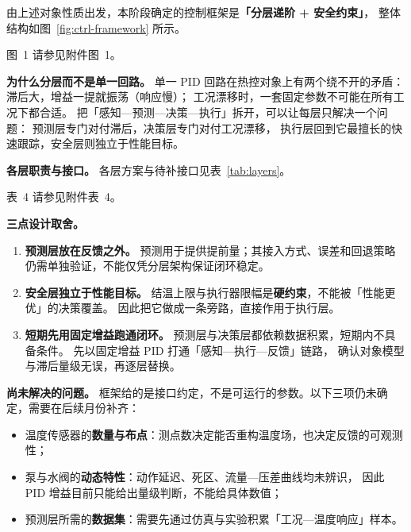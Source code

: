 \documentclass[stage2,fontset=fandol]{ydzjreport}
\makeatletter
\newcommand{\submissionnumber}[1]{\def\@currentlabel{#1}}
\makeatother
\begin{document}
	由上述对象性质出发，本阶段确定的控制框架是\textbf{「分层递阶 + 安全约束」}，
	整体结构如图~\ref{fig:ctrl-framework} 所示。


\par\noindent \begingroup\submissionnumber{1}\label{fig:ctrl-framework}\endgroup 图~1 请参见附件图~1。\par


	\textbf{为什么分层而不是单一回路。}
	单一 PID 回路在热控对象上有两个绕不开的矛盾：
	滞后大，增益一提就振荡（响应慢）；
	工况漂移时，一套固定参数不可能在所有工况下都合适。
	把「感知—预测—决策—执行」拆开，可以让每层只解决一个问题：
	预测层专门对付滞后，决策层专门对付工况漂移，
	执行层回到它最擅长的快速跟踪，安全层则独立于性能目标。

	\textbf{各层职责与接口。}
各层方案与待补接口见表~\ref{tab:layers}。


\par\noindent \begingroup\submissionnumber{4}\label{tab:layers}\endgroup 表~4 请参见附件表~4。\par


	\textbf{三点设计取舍。}

	\begin{enumerate}
		\item \textbf{预测层放在反馈之外。}
		预测用于提供提前量；其接入方式、误差和回退策略仍需单独验证，不能仅凭分层架构保证闭环稳定。
		\item \textbf{安全层独立于性能目标。}
		结温上限与执行器限幅是\textbf{硬约束}，不能被「性能更优」的决策覆盖。
		因此把它做成一条旁路，直接作用于执行层。
		\item \textbf{短期先用固定增益跑通闭环。}
		预测层与决策层都依赖数据积累，短期内不具备条件。
		先以固定增益 PID 打通「感知—执行—反馈」链路，
		确认对象模型与滞后量级无误，再逐层替换。
	\end{enumerate}

	\textbf{尚未解决的问题。}
	框架给的是接口约定，不是可运行的参数。以下三项仍未确定，需要在后续月份补齐：

	\begin{itemize}
		\item 温度传感器的\textbf{数量与布点}：测点数决定能否重构温度场，也决定反馈的可观测性；
		\item 泵与水阀的\textbf{动态特性}：动作延迟、死区、流量—压差曲线均未辨识，
		因此 PID 增益目前只能给出量级判断，不能给具体数值；
		\item 预测层所需的\textbf{数据集}：需要先通过仿真与实验积累「工况—温度响应」样本。
	\end{itemize}
\end{document}
